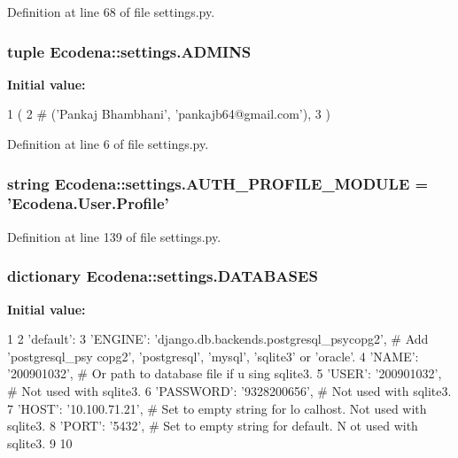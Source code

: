 Definition at line 68 of file settings.py.

\hypertarget{namespace_ecodena_1_1settings_aa5eefb4c0b5c39c9094d35a2878057b5}{
\subsubsection[{ADMINS}]{\setlength{\rightskip}{0pt plus 5cm}tuple {\bf Ecodena::settings.ADMINS}}}
\label{d1/d62/namespace_ecodena_1_1settings_aa5eefb4c0b5c39c9094d35a2878057b5}
{\bfseries Initial value:}
\begin{DoxyCode}
1 (
2     # ('Pankaj Bhambhani', 'pankajb64@gmail.com'),
3 )
\end{DoxyCode}


Definition at line 6 of file settings.py.

\hypertarget{namespace_ecodena_1_1settings_a7ffd079a2ae998fcd397ee29a253cea4}{
\subsubsection[{AUTH\_\-PROFILE\_\-MODULE}]{\setlength{\rightskip}{0pt plus 5cm}string {\bf Ecodena::settings.AUTH\_\-PROFILE\_\-MODULE} = 'Ecodena.User.Profile'}}
\label{d1/d62/namespace_ecodena_1_1settings_a7ffd079a2ae998fcd397ee29a253cea4}


Definition at line 139 of file settings.py.

\hypertarget{namespace_ecodena_1_1settings_afb77b339554c377a23190143df82d805}{
\subsubsection[{DATABASES}]{\setlength{\rightskip}{0pt plus 5cm}dictionary {\bf Ecodena::settings.DATABASES}}}
\label{d1/d62/namespace_ecodena_1_1settings_afb77b339554c377a23190143df82d805}
{\bfseries Initial value:}
\begin{DoxyCode}
1 {
2     'default': {
3         'ENGINE': 'django.db.backends.postgresql_psycopg2', # Add 'postgresql_psy
      copg2', 'postgresql', 'mysql', 'sqlite3' or 'oracle'.
4         'NAME': '200901032',                      # Or path to database file if u
      sing sqlite3.
5         'USER': '200901032',                      # Not used with sqlite3.
6         'PASSWORD': '9328200656',                  # Not used with sqlite3.
7         'HOST': '10.100.71.21',                      # Set to empty string for lo
      calhost. Not used with sqlite3.
8         'PORT': '5432',                      # Set to empty string for default. N
      ot used with sqlite3.
9     }
10 }
\end{DoxyCode}


